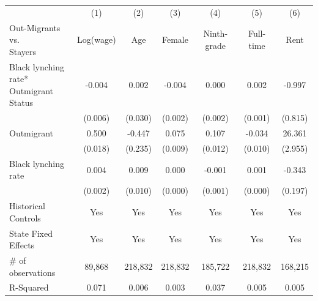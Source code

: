 {
\def\sym#1{\ifmmode^{#1}\else\(^{#1}\)\fi}
\begin{tabular}{l*{6}{c}}
\hline\hline
                    &\multicolumn{1}{c}{(1)}&\multicolumn{1}{c}{(2)}&\multicolumn{1}{c}{(3)}&\multicolumn{1}{c}{(4)}&\multicolumn{1}{c}{(5)}&\multicolumn{1}{c}{(6)}\\
\makecell[l]{Out-Migrants vs.\\Stayers}&   Log(wage)&         Age&      Female& Ninth-grade&   Full-time&        Rent\\
\hline
\makecell[l]{Black lynching rate*\\Outmigrant Status}&      -0.004&       0.002&      -0.004&       0.000&       0.002&      -0.997\\
                    &     (0.006)&     (0.030)&     (0.002)&     (0.002)&     (0.001)&     (0.815)\\
Outmigrant          &       0.500&      -0.447&       0.075&       0.107&      -0.034&      26.361\\
                    &     (0.018)&     (0.235)&     (0.009)&     (0.012)&     (0.010)&     (2.955)\\
Black lynching rate &       0.004&       0.009&       0.000&      -0.001&       0.001&      -0.343\\
                    &     (0.002)&     (0.010)&     (0.000)&     (0.001)&     (0.000)&     (0.197)\\
Historical Controls &         Yes&         Yes&         Yes&         Yes&         Yes&         Yes\\
State Fixed Effects &         Yes&         Yes&         Yes&         Yes&         Yes&         Yes\\
\hline
\# of observations  &      89,868&     218,832&     218,832&     185,722&     218,832&     168,215\\
R-Squared           &       0.071&       0.006&       0.003&       0.037&       0.005&       0.005\\
\hline\hline
\end{tabular}
}
